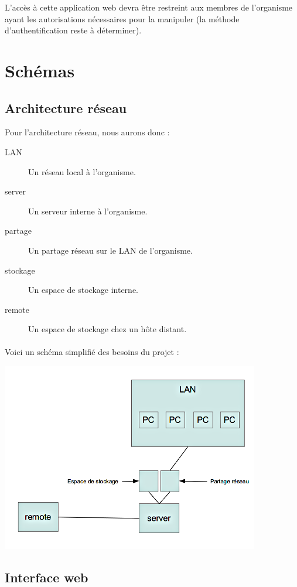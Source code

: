 L'accès à cette application web devra être restreint aux membres de l'organisme ayant les autorisations
nécessaires pour la manipuler (la méthode d'authentification reste à déterminer).

\section{Schémas}

\subsection{Architecture réseau}

Pour l'architecture réseau, nous aurons donc :

\begin{description}
     \item[LAN] Un réseau local à l'organisme.
     \item[server] Un serveur interne à l'organisme.
     \item[partage] Un partage réseau sur le LAN de l'organisme.
     \item[stockage] Un espace de stockage interne.
     \item[remote] Un espace de stockage chez un hôte distant.
\end{description}

\paragraph{}
Voici un schéma simplifié des besoins du projet :

\includegraphics{img/schema01.png}

\subsection{Interface web}

